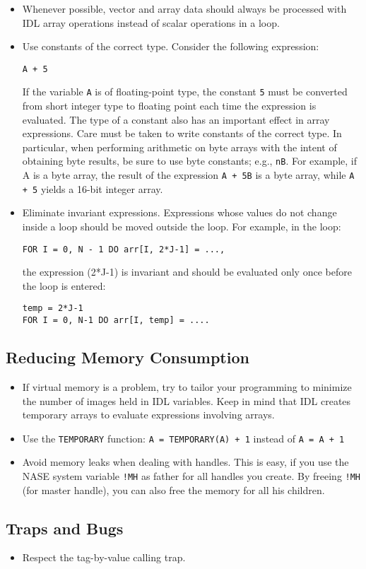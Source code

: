 \documentclass[12pt]{article}
\begin{document}
\begin{itemize}
\item Whenever possible, vector and array data should always be processed with IDL array operations instead of scalar operations in a loop. 
%
\item Use constants of the correct type. Consider the following expression:
\begin{verbatim}
A + 5
\end{verbatim}
If the variable \texttt{A} is of floating-point type, the constant \texttt{5} must be converted from short integer type to floating point each time the expression is evaluated. The type of a constant also has an important effect in array expressions. Care must be taken to write constants of the correct type. In particular, when performing arithmetic on byte arrays with the intent of obtaining byte results, be sure to use byte constants; e.g., \texttt{nB}. For example, if A is a byte array, the result of the expression \texttt{A + 5B} is a byte array, while \texttt{A + 5} yields a 16-bit integer array.
%
\item Eliminate invariant expressions. Expressions whose values do not change inside a loop should be moved outside the loop. For example, in the loop:
\begin{verbatim}
FOR I = 0, N - 1 DO arr[I, 2*J-1] = ...,
\end{verbatim}
the expression (2*J-1) is invariant and should be evaluated only once before the loop is entered:
\begin{verbatim}
temp = 2*J-1
FOR I = 0, N-1 DO arr[I, temp] = ....
\end{verbatim}
%
\end{itemize}


\subsection{Reducing Memory Consumption}
\begin{itemize}
\item If virtual memory is a problem, try to tailor your programming to minimize the number of images held in IDL variables. Keep in mind that IDL creates temporary arrays to evaluate expressions involving arrays.  
\item Use the \texttt{TEMPORARY} function: \texttt{A = TEMPORARY(A) + 1} instead of \texttt{A = A + 1}
\item Avoid memory leaks when dealing with handles. This is easy, if you use the NASE system variable \texttt{!MH} as father for all handles you create. By freeing \texttt{!MH} (for master handle), you can also free the memory for all his children.
\end{itemize}


\subsection{Traps and Bugs}
\begin{itemize}
\item Respect the tag-by-value calling trap.
\end{itemize}

%
% 
\end{document}
